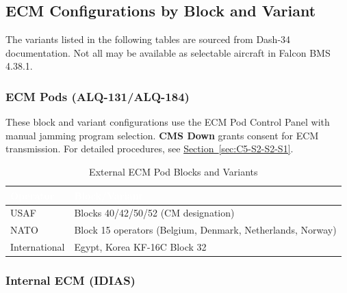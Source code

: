 \documentclass[11pt, a4paper, twoside]{report}
\newcommand{\secref}[1]{\hyperref[#1]{Section~\ref*{#1}}}
\begin{document}
\subsection{ECM Configurations by Block and Variant}
\label{sec:C5-S3-S1}

The variants listed in the following tables are sourced from Dash-34 documentation. Not all may be available as selectable aircraft in Falcon BMS 4.38.1.

\subsubsection{ECM Pods (ALQ-131/ALQ-184)}
\label{sec:C5-S3-S1-S1}

These block and variant configurations use the ECM Pod Control Panel with manual jamming program selection. \textbf{CMS Down} grants consent for ECM transmission. For detailed procedures, see \secref{sec:C5-S2-S2-S1}.

\begin{table}[H]
\centering
\caption{External ECM Pod Blocks and Variants}
\label{tab:C5-S3-external-ecm-pods}
\small
\renewcommand{\arraystretch}{1.25}
\begin{tabular}{|>{\raggedright\arraybackslash}p{3.0cm}|>{\raggedright\arraybackslash}p{5.8cm}|}
\hline
\rowcolor{headerblue}
\textcolor{white}{\textbf{Operator}} & \textcolor{white}{\textbf{Block/Variant}} \\
\hline
USAF & Blocks 40/42/50/52 (CM designation) \\
\hline
NATO & Block 15 operators (Belgium, Denmark, Netherlands, Norway) \\
\hline
International & Egypt, Korea KF-16C Block 32 \\
\hline
\end{tabular}
\end{table}

\subsubsection{Internal ECM (IDIAS)}
\label{sec:C5-S3-S1-S2}
\end{document}
